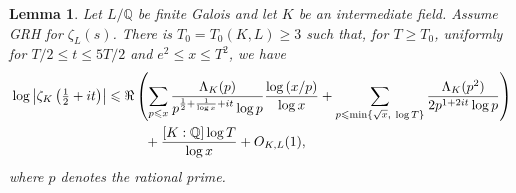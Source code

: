 \documentclass[twoside,reqno,11pt,a4paper]{amsart}
\numberwithin{equation}{section}
\theoremstyle{plain}
\newtheorem{lem}[thm]{Lemma}
\theoremstyle{definition}
\theoremstyle{remark}
\renewcommand{\le}{\leqslant}
\renewcommand{\ge}{\geqslant}
\begin{document}
	\begin{lem}\label{conditional-upper-bound}
			Let $L/\mathbb Q$ be finite Galois and let $K$ be an intermediate field. Assume GRH for $\zeta_L(s)$. There is $T_0=T_0(K,L)\ge3$ such that, for $T\ge T_0$, uniformly for $T/2\le t\le5T/2$ and $e^2\le x\le T^2$, we have
		\begin{align*}
			&\log \left| \zeta_K\left(\tfrac{1}{2}+it\right)\right|
				\le  \Re\left( \sum_{p\le  x} \frac{\Lambda_K(p)}{p^{\frac{1}{2}+\frac{1}{\log x}+ it}\log p} \frac{\log\left(x/p\right)}{\log x}+ \sum_{p\le  \min\{ \sqrt{x}, \ \log T\}} \frac{\Lambda_K(p^2)}{2p^{1+2it}\log p}\right)\\
					& \hspace{3.5cm}+ \frac{[K:\mathbb{Q}]\log T}{\log x} +O_{K,L}(1),
		\end{align*}
		where $p$ denotes the rational prime.
	\end{lem}
\end{document}
